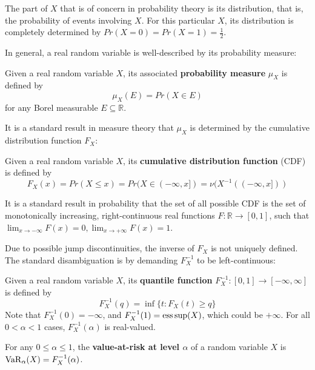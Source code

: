 The part of $X$ that is of concern in probability theory is its distribution, that is, the probability of events involving $X$. For this particular $X$, its distribution is completely determined by $Pr(X = 0) = Pr(X=1) = \frac 1 2$.

In general, a real random variable is well-described by its probability measure:
\begin{defn}
Given a real random variable $X$, its associated \textbf{probability measure} $\mu_X$ is defined by 
\begin{equation}
\mu_X(E) = Pr(X \in E)
\label{eq:probability_measure}
\end{equation}
for any Borel measurable $E\subseteq \mathbb{R}$.
\end{defn}

It is a standard result in measure theory that $\mu_X$ is determined by the cumulative distribution function $F_X$:
\begin{defn}\label{defn:CDF}
Given a real random variable $X$, its \textbf{cumulative distribution function} (CDF) is defined by 
\begin{equation}
F_X(x) = Pr(X\le x) = Pr(X \in (-\infty, x]) = \nu(X^{-1}((-\infty, x]))
\label{eq:CDF}
\end{equation}
\end{defn}

It is a standard result in probability that the set of all possible CDF is the set of monotonically increasing, right-continuous real functions $F:\mathbb{R}\to[0, 1]$, such that $\lim_{x\to -\infty}F(x) = 0, \lim_{x\to +\infty}F(x) = 1$.

Due to possible jump discontinuities, the inverse of $F_X$ is not uniquely defined. The standard disambiguation is by demanding $F_X^{-1}$ to be left-continuous:
\begin{defn}
	Given a real random variable $X$, its \textbf{quantile function} $F_X^{-1}:[0, 1] \to [-\infty, \infty]$ is defined by 
	\begin{equation}
	F_X^{-1}(q) = \inf \{t : F_X(t) \ge q\} 
	\label{eq:quantile}
	\end{equation}
	Note that $	F_X^{-1}(0) = -\infty$, and $F_X^{-1}(1) = \operatorname*{ess\,sup}(X)$, which could be $+\infty$. For all $0<\alpha < 1$ cases, $F_X^{-1}(\alpha)$ is real-valued.
\end{defn}

\begin{ex}\label{ex:var}
For any $0\le\alpha\le 1$, the \textbf{value-at-risk at level $\alpha$} of a random variable $X$ is $\operatorname{VaR}_\alpha(X) = F_X^{-1}(\alpha)$.
\end{ex}


